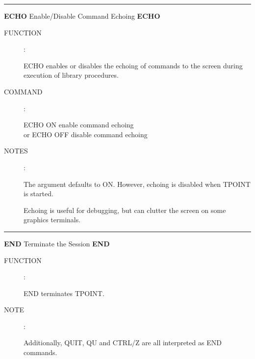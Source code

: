 \goodbreak
\rule{\textwidth}{0.3mm}
{\Large {\bf ECHO} \hfill Enable/Disable Command Echoing \hfill {\bf ECHO}}
\begin{description}
\item [FUNCTION]:

ECHO enables or disables the echoing of commands to the
screen during execution of library procedures.

\item [COMMAND]:

\begin{cmd}
\> \> ECHO ON \> enable command echoing \\
\> or \> ECHO OFF \> disable command echoing
\end{cmd}

\item [NOTES]:

The argument defaults to ON.  However, echoing is disabled when
TPOINT is started.

Echoing is useful for debugging, but can clutter the screen on
some graphics terminals.

\end{description}


\goodbreak
\rule{\textwidth}{0.3mm}
{\Large {\bf END} \hfill Terminate the Session \hfill {\bf END}}
\begin{description}
\item [FUNCTION]:

END terminates TPOINT.

\item [NOTE]:

Additionally, QUIT, QU and CTRL/Z are all interpreted as
END commands.

\end{description}


